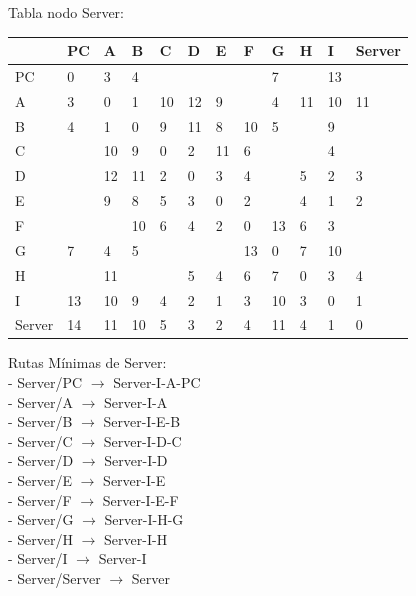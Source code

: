 \documentclass[a4paper]{article}
\begin{document}
\begin{table}[ht]
Tabla nodo Server:\\
\begin{tabular}{|l|l|l|l|l|l|l|l|l|l|l|l|}
\hline
       & PC & A  & B & C & D & E & F & G & H & I  & Server \\ \hline
PC     & 0  & 3  & 4 &   &   &   &   & 7 &   & 13 &        \\ \hline
A      & 3  & 0  & 1 & 10& 12& 9 &   & 4 & 11& 10 & 11     \\ \hline
B      & 4  & 1  & 0 & 9 & 11& 8 & 10& 5 &   & 9  &        \\ \hline
C      &    & 10 & 9 & 0 & 2 & 11& 6 &   &   & 4  &        \\ \hline
D      &    & 12 & 11& 2 & 0 & 3 & 4 &   & 5 & 2  & 3      \\ \hline
E      &    & 9  & 8 & 5 & 3 & 0 & 2 &   & 4 & 1  & 2      \\ \hline
F      &    &    & 10& 6 & 4 & 2 & 0 & 13& 6 & 3  &        \\ \hline
G      & 7  & 4  & 5 &   &   &   & 13& 0 & 7 & 10 &        \\ \hline
H      &    & 11 &   &   & 5 & 4 & 6 & 7 & 0 & 3  & 4      \\ \hline
I      & 13 & 10 & 9 & 4 & 2 & 1 & 3 & 10& 3 & 0  & 1      \\ \hline
Server & 14 & 11 & 10& 5 & 3 & 2 & 4 & 11& 4 & 1  & 0      \\ \hline
\end{tabular}

Rutas Mínimas de Server:\\
-	Server/PC  $\rightarrow$  Server-I-A-PC\\
-	Server/A  $\rightarrow$ Server-I-A\\
-	Server/B  $\rightarrow$  Server-I-E-B\\
-	Server/C  $\rightarrow$  Server-I-D-C\\
-	Server/D  $\rightarrow$  Server-I-D\\
-	Server/E  $\rightarrow$  Server-I-E\\
-	Server/F  $\rightarrow$  Server-I-E-F\\
-	Server/G  $\rightarrow$ Server-I-H-G\\
-	Server/H  $\rightarrow$  Server-I-H\\
-	Server/I  $\rightarrow$ Server-I\\
-	Server/Server  $\rightarrow$  Server\\

\end{table}
\end{document}

